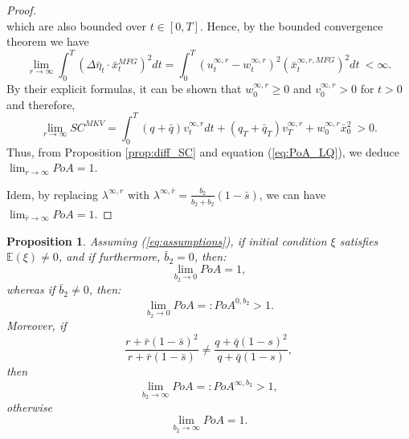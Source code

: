 \documentclass[11pt]{article}
\newtheorem{proposition}{Proposition}
\begin{document}
\begin{proof}
$$	$$
	which are also bounded over $t\in[0,T]$.
	Hence, by the bounded convergence theorem we have
	\begin{equation*}
		\lim_{r \to \infty} \int_0^T (\Delta \bar{\eta}_t \cdot \bar{x}_t^{MFG})^2 dt = \int_0^T (u^{\infty,r}_t- w^{\infty,r}_t)^2 (\bar{x}_t^{\infty,r,MFG})^2 dt \  < \infty.
	\end{equation*}
	By their explicit formulas, it can be shown that $w^{\infty,r}_0\geq0$ and $v^{\infty,r}_0 >0$ for $t>0$ and therefore,
	\begin{equation*}
		\lim_{r \to \infty} SC^{MKV} = \int_0^T (q+\bar{q}) v^{\infty,r}_t dt + (q_T + \bar{q}_T) v^{\infty,r}_T + w^{\infty,r}_0 \bar{x}_0^2 \  >0.
	\end{equation*}
	Thus, from Proposition \ref{prop:diff_SC} and equation (\ref{eq:PoA_LQ}), we deduce $\displaystyle \lim_{r \to \infty} PoA = 1$. 
	
	Idem, by replacing $\lambda^{\infty,r}$ with $\lambda^{\infty,\bar{r}} = \frac{b_2}{b_2 + \bar{b}_2} (1 - \bar{s})$, we can have $\displaystyle \lim_{\bar{r} \to \infty} PoA = 1$.
	
\end{proof}

\begin{proposition}
	Assuming (\ref{eq:assumptions}), if initial condition $\xi$ satisfies $\mathbb{E}(\xi)\neq 0$, and if furthermore, $\bar{b}_2= 0$, then:
	\begin{equation*}
	 \lim_{b_2 \to 0} PoA = 1,
	\end{equation*}
	whereas if $\bar{b}_2 \neq 0$, then:
	\begin{equation*}
	 \lim_{b_2 \to 0} PoA =: PoA^{0,b_2} > 1.
	\end{equation*}
	Moreover, if
		$$ \frac{r + \bar{r}(1-\bar{s})^2}{r + \bar{r}(1-\bar{s})} \neq \frac{q + \bar{q}(1-s)^2}{q + \bar{q}(1-s)},$$
	then
	$$\lim_{b_2 \to \infty} PoA =: PoA^{\infty, b_2} > 1,$$
	otherwise
	$$ \lim_{b_2 \to \infty} PoA = 1.$$	
	\label{prop:b2}
\end{proposition}
\end{document}
